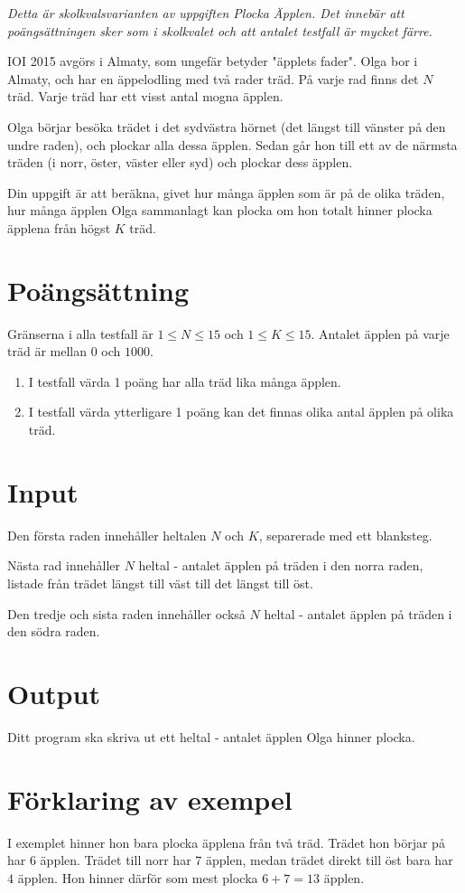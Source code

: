 
\emph{Detta är skolkvalsvarianten av uppgiften Plocka Äpplen. Det innebär att poängsättningen sker som i skolkvalet och att antalet testfall är mycket färre.}

IOI 2015 avgörs i Almaty, som ungefär betyder "äpplets fader". Olga bor i Almaty, och har en äppelodling med två rader träd.
På varje rad finns det $N$ träd. Varje träd har ett visst antal mogna äpplen.

Olga börjar besöka trädet i det sydvästra hörnet (det längst till vänster på den undre raden), och plockar alla dessa äpplen.
Sedan går hon till ett av de närmsta träden (i norr, öster, väster eller syd) och plockar dess äpplen.

Din uppgift är att beräkna, givet hur många äpplen som är på de olika träden, hur många äpplen Olga sammanlagt kan plocka
om hon totalt hinner plocka äpplena från högst $K$ träd.

\section*{Poängsättning}
Gränserna i alla testfall är $1 \le N \le 15$ och $1 \le K \le 15$. Antalet äpplen på varje
träd är mellan $0$ och $1000$.

\begin{enumerate}
\item I testfall värda 1 poäng har alla träd lika många äpplen.
\item I testfall värda ytterligare 1 poäng kan det finnas olika antal äpplen på olika träd.
\end{enumerate}

\section*{Input}
Den första raden innehåller heltalen $N$ och $K$, separerade med ett blanksteg.

Nästa rad innehåller $N$ heltal - antalet äpplen på träden i den norra raden, listade från trädet längst till väst till det längst till öst.

Den tredje och sista raden innehåller också $N$ heltal - antalet äpplen på träden i den södra raden.

\section*{Output}
Ditt program ska skriva ut ett heltal - antalet äpplen Olga hinner plocka.

\section*{Förklaring av exempel}
I exemplet hinner hon bara plocka äpplena från två träd. Trädet hon börjar på har $6$ äpplen. Trädet till norr har $7$ äpplen, medan 
trädet direkt till öst bara har $4$ äpplen. Hon hinner därför som mest plocka $6 + 7 = 13$ äpplen.
